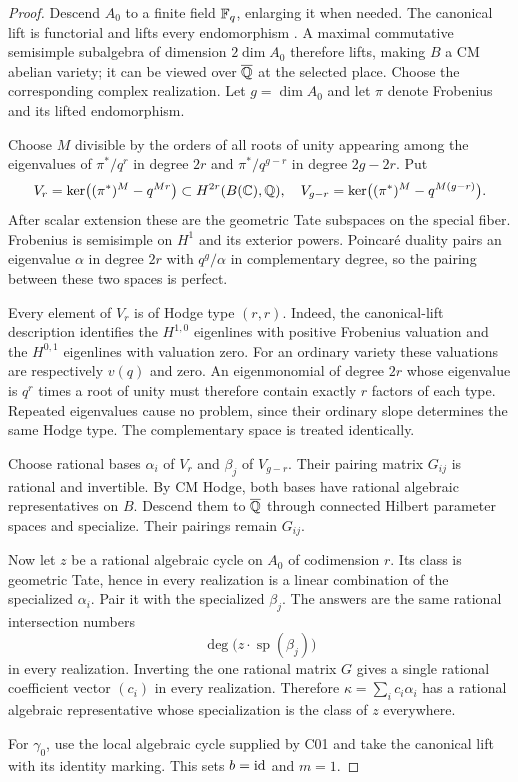 \begin{proof}
Descend $A_0$ to a finite field $\mathbb F_q$, enlarging it when needed. The canonical lift is functorial and lifts every endomorphism \cite[\S3]{DeligneOrdinary}. A maximal commutative semisimple subalgebra of dimension $2\dim A_0$ therefore lifts, making $B$ a CM abelian variety; it can be viewed over $\overline{\mathbb Q}$ at the selected place. Choose the corresponding complex realization. Let $g=\dim A_0$ and let $\pi$ denote Frobenius and its lifted endomorphism.

Choose $M$ divisible by the orders of all roots of unity appearing among the eigenvalues of $\pi^*/q^r$ in degree $2r$ and $\pi^*/q^{g-r}$ in degree $2g-2r$. Put
\[
V_r=\ker\bigl((\pi^*)^M-q^{Mr}\bigr)\subset H^{2r}(B(\mathbb C),\mathbb Q),
\quad
V_{g-r}=\ker\bigl((\pi^*)^M-q^{M(g-r)}\bigr).
\]
After scalar extension these are the geometric Tate subspaces on the special fiber. Frobenius is semisimple on $H^1$ and its exterior powers. Poincar\'e duality pairs an eigenvalue $\alpha$ in degree $2r$ with $q^g/\alpha$ in complementary degree, so the pairing between these two spaces is perfect.

Every element of $V_r$ is of Hodge type $(r,r)$. Indeed, the canonical-lift description \cite[\S8]{DeligneOrdinary} identifies the $H^{1,0}$ eigenlines with positive Frobenius valuation and the $H^{0,1}$ eigenlines with valuation zero. For an ordinary variety these valuations are respectively $v(q)$ and zero. An eigenmonomial of degree $2r$ whose eigenvalue is $q^r$ times a root of unity must therefore contain exactly $r$ factors of each type. Repeated eigenvalues cause no problem, since their ordinary slope determines the same Hodge type. The complementary space is treated identically.

Choose rational bases $\alpha_i$ of $V_r$ and $\beta_j$ of $V_{g-r}$. Their pairing matrix $G_{ij}$ is rational and invertible. By CM Hodge, both bases have rational algebraic representatives on $B$. Descend them to $\overline{\mathbb Q}$ through connected Hilbert parameter spaces and specialize. Their pairings remain $G_{ij}$.

Now let $z$ be a rational algebraic cycle on $A_0$ of codimension $r$. Its class is geometric Tate, hence in every realization is a linear combination of the specialized $\alpha_i$. Pair it with the specialized $\beta_j$. The answers are the same rational intersection numbers
\[
\deg\bigl(z\cdot\operatorname{sp}(\beta_j)\bigr)
\]
in every realization. Inverting the one rational matrix $G$ gives a single rational coefficient vector $(c_i)$ in every realization. Therefore $\kappa=\sum_i c_i\alpha_i$ has a rational algebraic representative whose specialization is the class of $z$ everywhere.

For $\gamma_0$, use the local algebraic cycle supplied by C01 and take the canonical lift with its identity marking. This sets $b=\operatorname{id}$ and $m=1$.
\end{proof}


